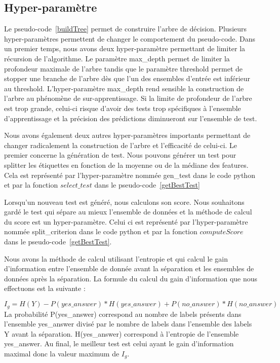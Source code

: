 \documentclass[french, 14pt]{memoir}
\begin{document}
\subsection{Hyper-paramètre}

Le pseudo-code~\ref{buildTree} permet de construire l'arbre de décision. Plusieurs hyper-paramètres permettent de changer le comportement du pseudo-code. Dans un premier temps, nous avons deux hyper-paramètre permettant de limiter la récursion de l'algorithme. Le paramètre max\_depth permet de limiter la profondeur maximale de l'arbre tandis que le paramètre threshold permet de stopper une branche de l'arbre dès que l'un des ensembles d'entrée est inférieur au threshold. L'hyper-paramètre max\_depth rend sensible la construction de l'arbre au phénomène de sur-apprentissage. Si la limite de profondeur de l'arbre est trop grande, celui-ci risque d'avoir des tests trop spécifiques à l'ensemble d'apprentissage et la précision des prédictions diminueront sur l'ensemble de test.

Nous avons également deux autres hyper-paramètres importants permettant de changer radicalement la construction de l'arbre et l'efficacité de celui-ci. Le premier concerne la génération de test. Nous pouvons générer un test pour splitter les étiquettes en fonction de la moyenne ou de la médiane des features. Cela est représenté par l'hyper-paramètre nommée gen\_test dans le code python et par la fonction $select\_test$ dans le pseudo-code~\ref{getBestTest}

Lorsqu'un nouveau test est généré, nous calculons son score. Nous souhaitons gardé le test qui sépare au mieux l'ensemble de données et la méthode de calcul du score est un hyper-paramètre. Celui ci est représenté par l'hyper-paramètre nommée split\_criterion dans le code python et par la fonction $computeScore$ dans le pseudo-code~\ref{getBestTest}.

 Nous avons la méthode de calcul utilisant l'entropie et qui calcul le gain d'information entre l'ensemble de donnée avant la séparation et les ensembles de données après la séparation. La formule du calcul du gain d'information que nous effectuons est la suivante :

\begin{equation}
I_{g} = H(Y) - P(yes\_answer) * H(yes\_answer) + P(no\_answer) * H(no\_answer)
\end{equation}
La probabilité P(yes\_answer) correspond au nombre de labels présents dans l'ensemble yes\_answer divisé par le nombre de labels dans l'ensemble des labels Y avant la séparation. H(yes\_answer) correspond à l'entropie de l'ensemble yes\_answer. Au final, le meilleur test est celui ayant le gain d'information maximal donc la valeur maximum de $I_g$.
\end{document}
